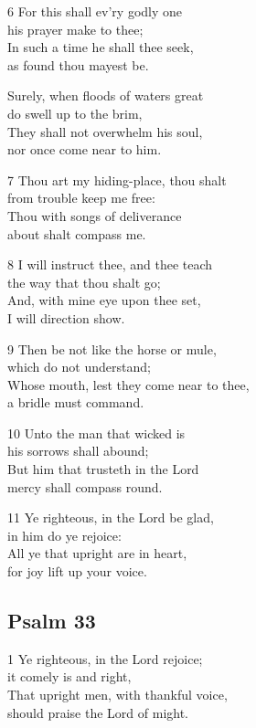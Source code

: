 \begin{multicols}{3}
6 For this shall ev’ry godly one\\
his prayer make to thee;\\
In such a time he shall thee seek,\\
as found thou mayest be.

Surely, when floods of waters great\\
do swell up to the brim,\\
They shall not overwhelm his soul,\\
nor once come near to him.

7 Thou art my hiding-place, thou shalt\\
from trouble keep me free:\\
Thou with songs of deliverance\\
about shalt compass me.

8 I will instruct thee, and thee teach\\
the way that thou shalt go;\\
And, with mine eye upon thee set,\\
I will direction show.

9 Then be not like the horse or mule,\\
which do not understand;\\
Whose mouth, lest they come near to thee,\\
a bridle must command.

10 Unto the man that wicked is\\
his sorrows shall abound;\\
But him that trusteth in the Lord\\
mercy shall compass round.

11 Ye righteous, in the Lord be glad,\\
in him do ye rejoice:\\
All ye that upright are in heart,\\
for joy lift up your voice.

\begin{center}
\quad{}\quad{}
\end{center}

\subsection*{Psalm 33 }

1 Ye righteous, in the Lord rejoice;\\
it comely is and right,\\
That upright men, with thankful voice,\\
should praise the Lord of might.


\end{multicols}
